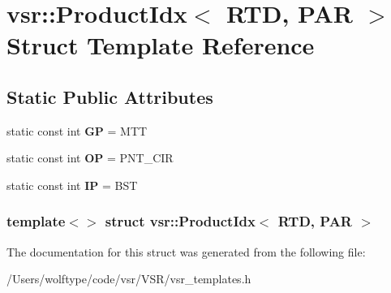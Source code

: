 \hypertarget{structvsr_1_1_product_idx_3_01_r_t_d_00_01_p_a_r_01_4}{\section{vsr\-:\-:Product\-Idx$<$ R\-T\-D, P\-A\-R $>$ Struct Template Reference}
\label{structvsr_1_1_product_idx_3_01_r_t_d_00_01_p_a_r_01_4}
}
\subsection*{Static Public Attributes}
\begin{DoxyCompactItemize}
\item 
\hypertarget{structvsr_1_1_product_idx_3_01_r_t_d_00_01_p_a_r_01_4_ab0d37dd9921e2cdf1d084389d4a179f4}{static const int {\bfseries G\-P} = M\-T\-T}\label{structvsr_1_1_product_idx_3_01_r_t_d_00_01_p_a_r_01_4_ab0d37dd9921e2cdf1d084389d4a179f4}

\item 
\hypertarget{structvsr_1_1_product_idx_3_01_r_t_d_00_01_p_a_r_01_4_aae36b9e7b1bdb24d81b0b708a97b4390}{static const int {\bfseries O\-P} = P\-N\-T\-\_\-\-C\-I\-R}\label{structvsr_1_1_product_idx_3_01_r_t_d_00_01_p_a_r_01_4_aae36b9e7b1bdb24d81b0b708a97b4390}

\item 
\hypertarget{structvsr_1_1_product_idx_3_01_r_t_d_00_01_p_a_r_01_4_afdac228503588c805d299c4ed4e499f7}{static const int {\bfseries I\-P} = B\-S\-T}\label{structvsr_1_1_product_idx_3_01_r_t_d_00_01_p_a_r_01_4_afdac228503588c805d299c4ed4e499f7}

\end{DoxyCompactItemize}
\subsubsection*{template$<$$>$ struct vsr\-::\-Product\-Idx$<$ R\-T\-D, P\-A\-R $>$}



The documentation for this struct was generated from the following file\-:\begin{DoxyCompactItemize}
\item 
/\-Users/wolftype/code/vsr/\-V\-S\-R/vsr\-\_\-templates.\-h\end{DoxyCompactItemize}
